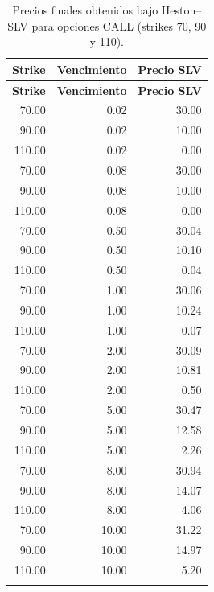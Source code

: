 \begin{longtable}{|r|r|r|}
\hline
\textbf{Strike} & \textbf{Vencimiento} & \textbf{Precio SLV} \\ \hline
\endfirsthead
\hline
\textbf{Strike} & \textbf{Vencimiento} & \textbf{Precio SLV} \\ \hline
\endhead
70.00  & 0.02  & 30.00 \\ \hline
90.00  & 0.02  & 10.00 \\ \hline
110.00 & 0.02  & 0.00 \\ \hline
70.00  & 0.08  & 30.00 \\ \hline
90.00  & 0.08  & 10.00 \\ \hline
110.00 & 0.08  & 0.00 \\ \hline
70.00  & 0.50  & 30.04 \\ \hline
90.00  & 0.50  & 10.10 \\ \hline
110.00 & 0.50  & 0.04 \\ \hline
70.00  & 1.00  & 30.06 \\ \hline
90.00  & 1.00  & 10.24 \\ \hline
110.00 & 1.00  & 0.07 \\ \hline
70.00  & 2.00  & 30.09 \\ \hline
90.00  & 2.00  & 10.81 \\ \hline
110.00 & 2.00  & 0.50 \\ \hline
70.00  & 5.00  & 30.47 \\ \hline
90.00  & 5.00  & 12.58 \\ \hline
110.00 & 5.00  & 2.26 \\ \hline
70.00  & 8.00  & 30.94 \\ \hline
90.00  & 8.00  & 14.07 \\ \hline
110.00 & 8.00  & 4.06 \\ \hline
70.00  & 10.00 & 31.22 \\ \hline
90.00  & 10.00 & 14.97 \\ \hline
110.00 & 10.00 & 5.20 \\ \hline
\caption{Precios finales obtenidos bajo Heston--SLV para opciones CALL (strikes 70, 90 y 110).}\label{tab:slv_precios_70_90_110}\\
\end{longtable}

